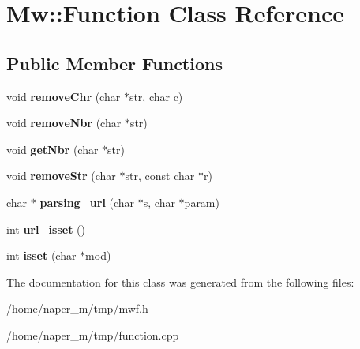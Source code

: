 \hypertarget{class_mw_1_1_function}{\section{Mw\-:\-:Function Class Reference}
\label{class_mw_1_1_function}
}
\subsection*{Public Member Functions}
\begin{DoxyCompactItemize}
\item 
\hypertarget{class_mw_1_1_function_a726791dd82b35565a9e8c97400bb14fd}{void {\bfseries remove\-Chr} (char $\ast$str, char c)}\label{class_mw_1_1_function_a726791dd82b35565a9e8c97400bb14fd}

\item 
\hypertarget{class_mw_1_1_function_aba0020e8e9d11d8c73e4980476177eb3}{void {\bfseries remove\-Nbr} (char $\ast$str)}\label{class_mw_1_1_function_aba0020e8e9d11d8c73e4980476177eb3}

\item 
\hypertarget{class_mw_1_1_function_a94d611f1a034d62967c0e0ab827073c1}{void {\bfseries get\-Nbr} (char $\ast$str)}\label{class_mw_1_1_function_a94d611f1a034d62967c0e0ab827073c1}

\item 
\hypertarget{class_mw_1_1_function_a3c18fc01f94321bebcf2960b03d2bb38}{void {\bfseries remove\-Str} (char $\ast$str, const char $\ast$r)}\label{class_mw_1_1_function_a3c18fc01f94321bebcf2960b03d2bb38}

\item 
\hypertarget{class_mw_1_1_function_addf6a11dbaa78a412ce21e7c38a425b1}{char $\ast$ {\bfseries parsing\-\_\-url} (char $\ast$s, char $\ast$param)}\label{class_mw_1_1_function_addf6a11dbaa78a412ce21e7c38a425b1}

\item 
\hypertarget{class_mw_1_1_function_a9378667cf45751be345ffe7ae79b03ac}{int {\bfseries url\-\_\-isset} ()}\label{class_mw_1_1_function_a9378667cf45751be345ffe7ae79b03ac}

\item 
\hypertarget{class_mw_1_1_function_ab12fb3043ad8fa7f0b041d26aa16271d}{int {\bfseries isset} (char $\ast$mod)}\label{class_mw_1_1_function_ab12fb3043ad8fa7f0b041d26aa16271d}

\end{DoxyCompactItemize}


The documentation for this class was generated from the following files\-:\begin{DoxyCompactItemize}
\item 
/home/naper\-\_\-m/tmp/mwf.\-h\item 
/home/naper\-\_\-m/tmp/function.\-cpp\end{DoxyCompactItemize}
